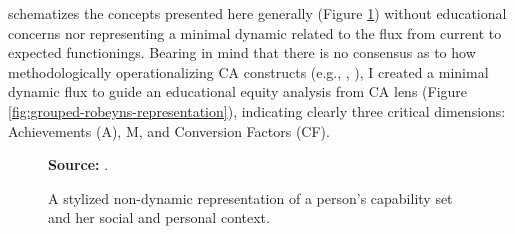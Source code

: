  schematizes the concepts presented here generally (Figure \ref{fig:robeyns-representation}) without educational concerns nor representing a minimal dynamic related to the flux from current to expected functionings. Bearing in mind that there is no consensus as to how methodologically operationalizing \gls{CA} constructs (e.g., , ), I created a minimal dynamic flux to guide an educational equity analysis from \gls{CA} lens (Figure \ref{fig:grouped-robeyns-representation}), indicating clearly three critical dimensions: Achievements (\acrshort{A}), \acrfull{M}, and Conversion Factors (\acrshort{CF}). 

\begin{figure}[ht!]
\centering

\caption{\textmd{A stylized non-dynamic representation of a person's capability set and her social and personal context.}}
\label{fig:robeyns-representation}

\par\medskip\ABNTEXfontereduzida\selectfont\textbf{Source:} .
\end{figure}

